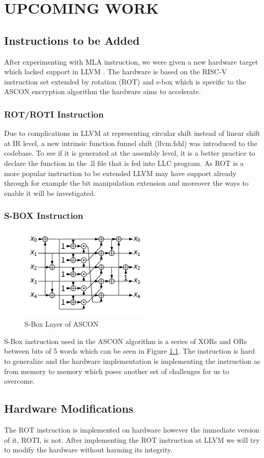 \clearpage
\chapter{UPCOMING WORK}\label{Ch6}
\section{Instructions to be Added}
After experimenting with MLA instruction, we were given a new hardware target which lacked support in LLVM \cite{eryilmaz}. The hardware is based on the RISC-V instruction set extended by rotation (ROT) and s-box which is specific to the ASCON encryption algorithm the hardware aims to accelerate. 
\par
\subsection{ROT/ROTI Instruction}
Due to complications in LLVM at representing circular shift instead of linear shift at IR level, a new intrinsic function funnel shift (llvm.fshl) was introduced to the codebase. To see if it is generated at the assembly level, it is a better practice to declare the function in the .ll file that is fed into LLC program. As ROT is a more popular instruction to be extended LLVM may have support already through for example the bit manipulation extension and moreover the ways to enable it will be investigated. 

\subsection{S-BOX Instruction}
 
\begin{figure}
    \centering
    \includegraphics{upcoming_work/s_box_ascon.png}
    \caption{S-Box Layer of ASCON}
    \label{fig:sbox}
\end{figure}
S-Box instruction used in the ASCON algorithm is a series of XORs and ORs between bits of 5 words which can be seen in Figure \ref{fig:sbox}. The instruction is hard to generalize and the hardware implementation is implementing the instruction as from memory to memory which poses another set of challenges for us to overcome.
\section{Hardware Modifications}
The ROT instruction is implemented on hardware however the immediate version of it, ROTI, is not. After implementing the ROT instruction at LLVM we will try to modify the hardware without harming its integrity.
